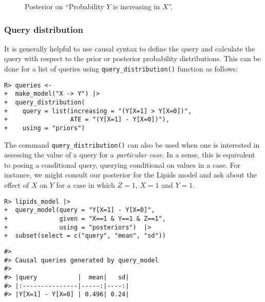 \documentclass[
  11pt,
  article]{jss}
\begin{document}
\begin{figure}[t]


\caption{\label{fig-posterior-dist}Posterior on ``Probability \(Y\) is
increasing in \(X\)''.}

\end{figure}%

\FloatBarrier

\subsubsection{Query distribution}\label{query-distribution}

It is generally helpful to use causal syntax to define the query and
calculate the query with respect to the prior or posterior probability
distributions. This can be done for a list of queries using
\texttt{query\_distribution()} function as follows:

\begin{verbatim}
R> queries <- 
+  make_model("X -> Y") |> 
+  query_distribution(
+    query = list(increasing = "(Y[X=1] > Y[X=0])",
+                 ATE = "(Y[X=1] - Y[X=0])"), 
+    using = "priors")
\end{verbatim}

The command \texttt{query\_distribution()} can also be used when one is
interested in assessing the value of a query for a \emph{particular
case}. In a sense, this is equivalent to posing a conditional query,
querying conditional on values in a case. For instance, we might consult
our posterior for the Lipids model and ask about the effect of \(X\) on
\(Y\) for a case in which \(Z=1\), \(X=1\) and \(Y=1\).

\begin{verbatim}
R> lipids_model |>
+  query_model(query = "Y[X=1] - Y[X=0]",
+              given = "X==1 & Y==1 & Z==1",
+              using = "posteriors")  |> 
+  subset(select = c("query", "mean", "sd"))
\end{verbatim}

\begin{verbatim}
#> 
#> Causal queries generated by query_model
#> 
#> |query           |  mean|   sd|
#> |:---------------|-----:|----:|
#> |Y[X=1] - Y[X=0] | 0.496| 0.24|
\end{verbatim}
\end{document}
